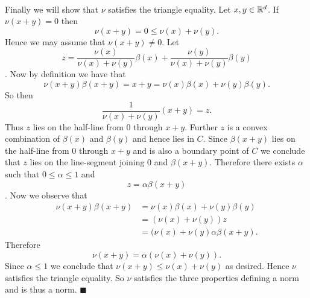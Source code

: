 \documentclass[letterpaper,12pt,oneside,onecolumn]{article}
\begin{document}
\paragraph{}
Finally we will show that $\nu$ satisfies the triangle equality. Let $x,y\in \mathbb{R}^d$. If $\nu(x+y) = 0$ then $$\nu(x+y) = 0 \leq \nu(x) + \nu(y).$$ Hence we may assume that $\nu(x+y) \neq 0$. Let $$z = \frac{\nu(x)}{\nu(x)+ \nu(y)} \beta(x) + \frac{\nu(y)}{\nu(x) + \nu(y)} \beta(y)$$. Now by definition we have that
$$\nu(x+y) \beta(x+y) = x+y = \nu(x) \beta(x) + \nu(y) \beta(y).$$
So then $$\frac{1}{\nu(x) + \nu(y)}(x+y) = z.$$
Thus $z$ lies on the half-line from $0$ through $x+y$. Further $z$ is a convex combination of $\beta(x)$ and $\beta(y)$ and hence lies in $C$. Since $\beta(x+y)$ lies on the half-line from $0$ through $x+y$ and is also a boundary point of $C$ we conclude that $z$ lies on the line-segment joining $0$ and $\beta(x+y)$. Therefore there exists $\alpha$ such that $0\leq \alpha\leq 1$ and $$z = \alpha \beta(x+y)$$.
Now we observe that
\begin{align*}
\nu(x+y) \beta(x+y) &= \nu(x) \beta(x) + \nu(y)\beta(y)\\
 &= (\nu(x) + \nu(y))z \\
&= (\nu(x) + \nu(y)\alpha \beta(x+y).
\end{align*}
Therefore
$$\nu(x+y) = \alpha(\nu(x) + \nu(y)).$$
Since $\alpha \leq 1$ we conclude that $\nu(x+y) \leq \nu(x) + \nu(y)$ as desired. Hence $\nu$ satisfies the triangle equality. So $\nu$ satisfies the three properties defining a norm and is thus a norm. $\blacksquare$
\end{document}
